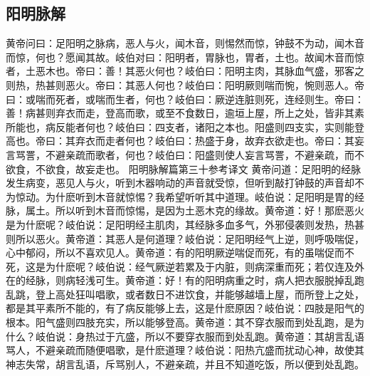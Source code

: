 \documentclass[a4paper,12pt,UTF8,twoside]{ctexbook}
\begin{document}
\chapter{阳明脉解}
黄帝问曰：足阳明之脉病，恶人与火，闻木音，则惕然而惊，钟鼓不为动，闻木音而惊，何也？愿闻其故。岐伯对曰：阳明者，胃脉也，胃者，土也。故闻木音而惊者，土恶木也。帝曰：善！其恶火何也？岐伯曰：阳明主肉，其脉血气盛，邪客之则热，热甚则恶火。帝曰：其恶人何也？岐伯曰：阳明厥则喘而惋，惋则恶人。帝曰：或喘而死者，或喘而生者，何也？岐伯曰：厥逆连脏则死，连经则生。帝曰：善！病甚则弃衣而走，登高而歌，或至不食数日，逾垣上屋，所上之处，皆非其素所能也，病反能者何也？岐伯曰：四支者，诸阳之本也。阳盛则四支实，实则能登高也。帝曰：其弃衣而走者何也？岐伯曰：热盛于身，故弃衣欲走也。帝曰：其妄言骂詈，不避亲疏而歌者，何也？岐伯曰：阳盛则使人妄言骂詈，不避亲疏，而不欲食，不欲食，故妄走也。
阳明脉解篇第三十参考译文
黄帝问道：足阳明的经脉发生病变，恶见人与火，听到木器响动的声音就受惊，但听到敲打钟鼓的声音却不为惊动。为什麽听到木音就惊惕？我希望听听其中道理。岐伯说：足阳明是胃的经脉，属土。所以听到木音而惊惕，是因为土恶木克的缘故。黄帝道：好！那麽恶火是为什麽呢？岐伯说：足阳明经主肌肉，其经脉多血多气，外邪侵袭则发热，热甚则所以恶火。黄帝道：其恶人是何道理？岐伯说：足阳明经气上逆，则呼吸喘促，心中郁闷，所以不喜欢见人。黄帝道：有的阳明厥逆喘促而死，有的虽喘促而不死，这是为什麽呢？岐伯说：经气厥逆若累及于内脏，则病深重而死；若仅连及外在的经脉，则病轻浅可生。黄帝道：好！有的阳明病重之时，病人把衣服脱掉乱跑乱跳，登上高处狂叫唱歌，或者数日不进饮食，并能够越墙上屋，而所登上之处，都是其平素所不能的，有了病反能够上去，这是什麽原因？岐伯说：四肢是阳气的根本。阳气盛则四肢充实，所以能够登高。黄帝道：其不穿衣服而到处乱跑，是为什么？岐伯说：身热过于亢盛，所以不要穿衣服而到处乱跑。黄帝道：其胡言乱语骂人，不避亲疏而随便唱歌，是什麽道理？岐伯说：阳热亢盛而扰动心神，故使其神志失常，胡言乱语，斥骂别人，不避亲疏，并且不知道吃饭，所以便到处乱跑。

\part{}
\end{document}
